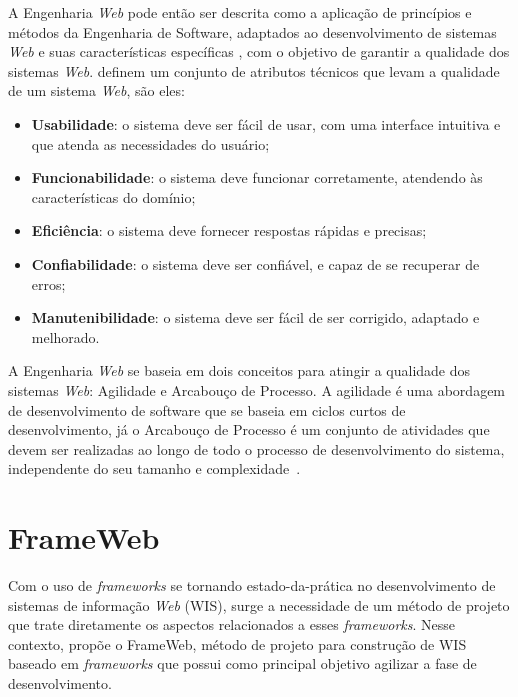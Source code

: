 A Engenharia \textit{Web} pode então ser descrita como a aplicação de princípios e métodos da Engenharia
de Software, adaptados ao desenvolvimento de sistemas \textit{Web} e suas características específicas 
\cite{beder:2017,murugesan:2001}, com o objetivo de garantir a qualidade dos sistemas \textit{Web}. 
 definem um conjunto de atributos técnicos que levam a qualidade de um sistema \textit{Web},
são eles:

\begin{itemize}
    \item \textbf{Usabilidade}: o sistema deve ser fácil de usar, com uma interface intuitiva e 
        que atenda as necessidades do usuário;
    \item \textbf{Funcionabilidade}: o sistema deve funcionar corretamente, atendendo às características
        do domínio;
    \item \textbf{Eficiência}: o sistema deve fornecer respostas rápidas e precisas;
    \item \textbf{Confiabilidade}: o sistema deve ser confiável, e capaz de se recuperar de erros;
    \item \textbf{Manutenibilidade}: o sistema deve ser fácil de ser corrigido, adaptado e melhorado.
\end{itemize}

A Engenharia \textit{Web} se baseia em dois conceitos para atingir a qualidade dos sistemas \textit{Web}: Agilidade e Arcabouço de Processo.
A agilidade é uma abordagem de desenvolvimento de software que se baseia em ciclos curtos de desenvolvimento,
já o Arcabouço de Processo é um conjunto de atividades que devem ser realizadas ao longo de todo o processo
de desenvolvimento do sistema, independente do seu tamanho e complexidade~\cite{beder:2017}.



\section{FrameWeb}
\label{sec-fundteo-frameweb}

Com o uso de \textit{frameworks} se tornando estado-da-prática no  desenvolvimento 
de sistemas de informação \textit{Web} (WIS), surge a necessidade de um método de projeto
que trate diretamente os aspectos relacionados a esses \textit{frameworks}.
Nesse contexto,  propõe o FrameWeb, método de projeto 
para construção de WIS baseado em \textit{frameworks} que possui como principal 
objetivo agilizar a fase de desenvolvimento.

